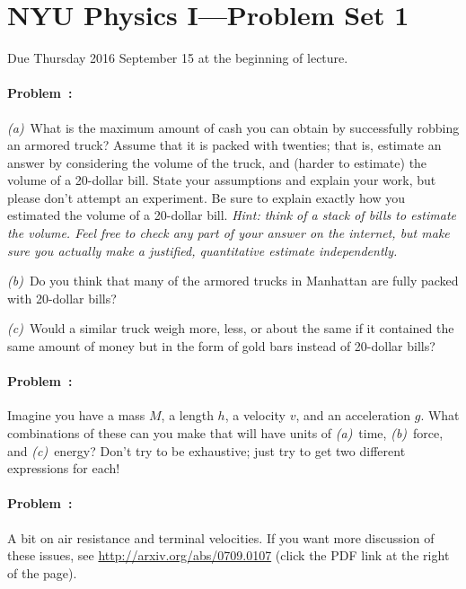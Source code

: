 \documentclass[12pt]{article}
\begin{document}
\section*{NYU Physics I---Problem Set 1}

Due Thursday 2016 September 15 at the beginning of lecture.

\paragraph{Problem~\theproblem:}%
\textsl{(a)}~What is the maximum amount of cash you can obtain by
successfully robbing an armored truck?  Assume that it is packed with
twenties; that is, estimate an answer by considering the volume of the
truck, and (harder to estimate) the volume of a 20-dollar bill.  State
your assumptions and explain your work, but please don't attempt an
experiment.  Be sure to explain exactly how you estimated the volume
of a 20-dollar bill.  \emph{Hint: think of a stack of bills to
  estimate the volume.  Feel free to \emph{check} any part of your
  answer on the internet, but make sure you actually make a justified,
  quantitative estimate independently.}

\textsl{(b)}~Do you think that many of the armored trucks in Manhattan
are fully packed with 20-dollar bills?

\textsl{(c)}~Would a similar truck weigh more, less, or about the same
if it contained the same amount of money but in the form of gold bars
instead of 20-dollar bills?

\paragraph{Problem~\theproblem:}%
Imagine you have a mass $M$, a length $h$, a velocity $v$, and an
acceleration $g$. What combinations of these can you make that will
have units of
\textsl{(a)}~time,
\textsl{(b)}~force, and
\textsl{(c)}~energy?
Don't try to be exhaustive; just try to get two different expressions
for each!

\paragraph{Problem~\theproblem:}%
A bit on air resistance and terminal velocities. If you want more
discussion of these issues, see \url{http://arxiv.org/abs/0709.0107}
(click the PDF link at the right of the page).
\end{document}
